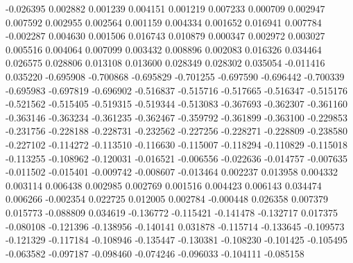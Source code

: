 -0.026395
0.002882
0.001239
0.004151
0.001219
0.007233
0.000709
0.002947
0.007592
0.002955
0.002564
0.001159
0.004334
0.001652
0.016941
0.007784
-0.002287
0.004630
0.001506
0.016743
0.010879
0.000347
0.002972
0.003027
0.005516
0.004064
0.007099
0.003432
0.008896
0.002083
0.016326
0.034464
0.026575
0.028806
0.013108
0.013600
0.028349
0.028302
0.035054
-0.011416
0.035220
-0.695908
-0.700868
-0.695829
-0.701255
-0.697590
-0.696442
-0.700339
-0.695983
-0.697819
-0.696902
-0.516837
-0.515716
-0.517665
-0.516347
-0.515176
-0.521562
-0.515405
-0.519315
-0.519344
-0.513083
-0.367693
-0.362307
-0.361160
-0.363146
-0.363234
-0.361235
-0.362467
-0.359792
-0.361899
-0.363100
-0.229853
-0.231756
-0.228188
-0.228731
-0.232562
-0.227256
-0.228271
-0.228809
-0.238580
-0.227102
-0.114272
-0.113510
-0.116630
-0.115007
-0.118294
-0.110829
-0.115018
-0.113255
-0.108962
-0.120031
-0.016521
-0.006556
-0.022636
-0.014757
-0.007635
-0.011502
-0.015401
-0.009742
-0.008607
-0.013464
0.002237
0.013958
0.004332
0.003114
0.006438
0.002985
0.002769
0.001516
0.004423
0.006143
0.034474
0.006266
-0.002354
0.022725
0.012005
0.002784
-0.000448
0.026358
0.007379
0.015773
-0.088809
0.034619
-0.136772
-0.115421
-0.141478
-0.132717
0.017375
-0.080108
-0.121396
-0.138956
-0.140141
0.031878
-0.115714
-0.133645
-0.109573
-0.121329
-0.117184
-0.108946
-0.135447
-0.130381
-0.108230
-0.101425
-0.105495
-0.063582
-0.097187
-0.098460
-0.074246
-0.096033
-0.104111
-0.085158
